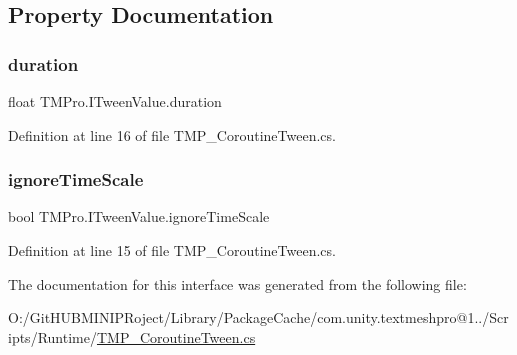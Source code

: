 \subsection{Property Documentation}
\mbox{\label{interface_t_m_pro_1_1_i_tween_value_a1b13b53073d463536d1c1c8165bc2a24}} 
\subsubsection{\texorpdfstring{duration}{duration}}
{\footnotesize\ttfamily float T\+M\+Pro.\+I\+Tween\+Value.\+duration\hspace{0.3cm}{\ttfamily [get]}}



Definition at line 16 of file T\+M\+P\+\_\+\+Coroutine\+Tween.\+cs.

\mbox{\label{interface_t_m_pro_1_1_i_tween_value_a4b32d163a38f053e9e7a830c44174fb4}} 
\subsubsection{\texorpdfstring{ignoreTimeScale}{ignoreTimeScale}}
{\footnotesize\ttfamily bool T\+M\+Pro.\+I\+Tween\+Value.\+ignore\+Time\+Scale\hspace{0.3cm}{\ttfamily [get]}}



Definition at line 15 of file T\+M\+P\+\_\+\+Coroutine\+Tween.\+cs.



The documentation for this interface was generated from the following file\+:\begin{DoxyCompactItemize}
\item 
O\+:/\+Git\+H\+U\+B\+M\+I\+N\+I\+P\+Roject/\+Library/\+Package\+Cache/com.\+unity.\+textmeshpro@1../\+Scripts/\+Runtime/\mbox{\hyperlink{_t_m_p___coroutine_tween_8cs}{T\+M\+P\+\_\+\+Coroutine\+Tween.\+cs}}\end{DoxyCompactItemize}
